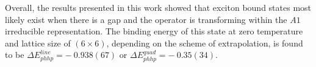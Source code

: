 Overall, the results presented in this work showed that exciton bound states most likely exist when there is a gap and the operator is transforming within the $A1$ irreducible representation. The binding energy of this state at zero temperature and lattice size of $(6\times 6)$, depending on the scheme of extrapolation, is found to be $\Delta E^{line}_{phhp} = -\:0.938(67)$ or $\Delta E^{quad}_{phhp} = -\:0.35(34)$.

